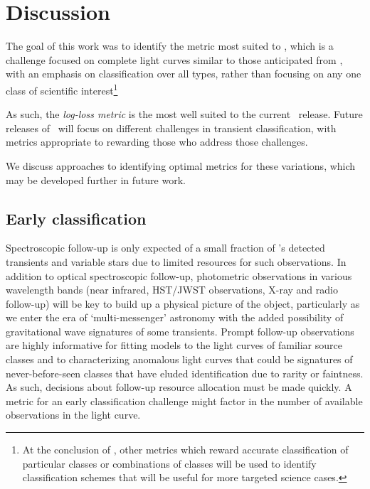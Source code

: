 \section{Discussion}
\label{sec:discussion}
The goal of this work was to identify the metric most suited to \plasticc, which is a challenge focused on complete light curves similar to those anticipated from \lsst, with an emphasis on classification over all types, rather than focusing on any one class of scientific interest\footnote{At the conclusion of \plasticc, other metrics which reward accurate classification of particular classes or combinations of classes will be used to identify classification schemes that will be useful for more targeted science cases.}

As such, the \textit{log-loss metric} is the most well suited to the current \plasticc\ release. Future releases of \plasticc\ will focus on different challenges in transient classification, with metrics appropriate to rewarding those who address those challenges.


We discuss approaches to identifying optimal metrics for these variations, which may be developed further in future work.

\subsection{Early classification}
\label{sec:early}

Spectroscopic follow-up is only expected of a small fraction of \lsst's detected transients and variable stars due to limited resources for such observations. In addition to optical spectroscopic follow-up, photometric observations in various wavelength bands (near infrared, HST/JWST observations, X-ray and radio follow-up) will be key to build up a physical picture of the object, particularly as we enter the era of `multi-messenger' astronomy with the added possibility of gravitational wave signatures of some transients.
Prompt follow-up observations are highly informative for fitting models to the light curves of familiar source classes and to characterizing anomalous light curves that could be signatures of never-before-seen classes that have eluded identification due to rarity or faintness. As such, decisions about follow-up resource allocation must be made quickly. A metric for an early classification challenge might factor in the number of available observations in the light curve.

